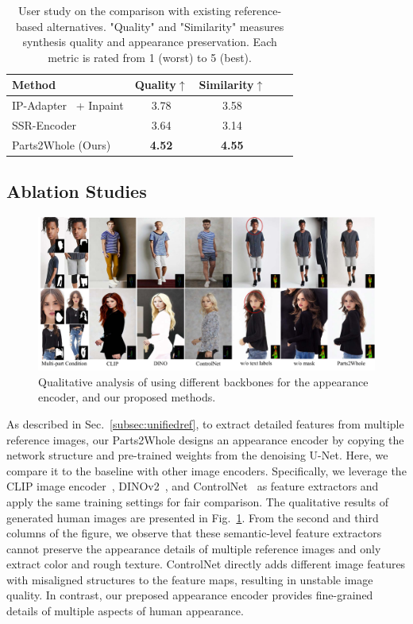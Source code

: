 \begin{table}
  \centering
  \caption{User study on the comparison with existing reference-based alternatives. "Quality" and "Similarity" measures synthesis quality and appearance preservation. Each metric is rated from 1 (worst) to 5 (best).}
  \begin{tabular}{@{}lcccc@{}}
    \toprule
    Method & Quality$\uparrow$ & Similarity$\uparrow$ \\
    \midrule
    IP-Adapter~\cite{ye2023ipadapter} + Inpaint &  3.78 & 3.58  \\
    SSR-Encoder~\cite{zhang2024ssrencoder} & 3.64  & 3.14 \\
   Parts2Whole (Ours) & \textbf{4.52} & \textbf{4.55} \\
    \bottomrule
  \end{tabular}
  \label{tab:user_study}
\end{table}

\subsection{Ablation Studies}

\begin{figure}
    \centering
    \includegraphics[width=\textwidth]{figure/ablation.pdf}
    \caption{Qualitative analysis of using different backbones for the appearance encoder, and our proposed methods.}
    \label{fig:ablation}
\end{figure}

As described in Sec.~\ref{subsec:unifiedref}, to extract detailed features from multiple reference images, our Parts2Whole designs an appearance encoder by copying the network structure and pre-trained weights from the denoising U-Net. Here, we compare it to the baseline with other image encoders. Specifically, we leverage the CLIP image encoder~\cite{radford2021clip}, DINOv2~\cite{oquab2024dinov2}, and ControlNet~\cite{zhang2023controlnet} as feature extractors and apply the same training settings for fair comparison. The qualitative results of generated human images are presented in Fig.~\ref{fig:ablation}. From the second and third columns of the figure, we observe that these semantic-level feature extractors cannot preserve the appearance details of multiple reference images and only extract color and rough texture. ControlNet directly adds different image features with misaligned structures to the feature maps, resulting in unstable image quality. In contrast, our preposed appearance encoder provides fine-grained details of multiple aspects of human appearance.

